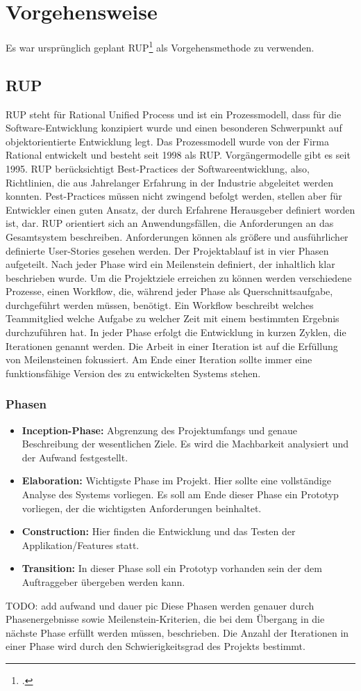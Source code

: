 \chapter{Vorgehensweise}
\reiter
Es war ursprünglich geplant RUP\footcite{Lehrunterlagen-RUP} als Vorgehensmethode zu verwenden. 
\section{RUP}
RUP steht für Rational Unified Process und ist ein Prozessmodell, dass für die Software-Entwicklung konzipiert wurde und einen besonderen Schwerpunkt auf objektorientierte Entwicklung legt. Das Prozessmodell wurde von der Firma Rational entwickelt und besteht seit 1998 als RUP. Vorgängermodelle gibt es seit 1995. 
RUP berücksichtigt Best-Practices der Softwareentwicklung, also, Richtlinien, die aus Jahrelanger Erfahrung in der Industrie abgeleitet werden konnten. Pest-Practices müssen nicht zwingend befolgt werden, stellen aber für Entwickler einen guten Ansatz, der durch Erfahrene Herausgeber definiert worden ist, dar. 
RUP orientiert sich an Anwendungsfällen, die Anforderungen an das Gesamtsystem beschreiben. Anforderungen können als größere und ausführlicher definierte User-Stories gesehen werden.  
Der Projektablauf ist in vier Phasen aufgeteilt. Nach jeder Phase wird ein Meilenstein definiert, der inhaltlich klar beschrieben wurde.
Um die Projektziele erreichen zu können werden verschiedene Prozesse, einen Workflow, die, während jeder Phase als Querschnittsaufgabe, durchgeführt werden müssen, benötigt. Ein Workflow beschreibt welches Teammitglied welche Aufgabe zu welcher Zeit mit einem bestimmten Ergebnis durchzuführen hat.
In jeder Phase erfolgt die Entwicklung in kurzen Zyklen, die Iterationen genannt werden. Die Arbeit in einer Iteration ist auf die Erfüllung von Meilensteinen fokussiert. Am Ende einer Iteration sollte immer eine funktionsfähige Version des zu entwickelten Systems stehen. 
\subsection{Phasen}
\begin{itemize}
	\item \textbf{Inception-Phase:} Abgrenzung des Projektumfangs und genaue Beschreibung der wesentlichen Ziele. Es wird die Machbarkeit analysiert und der Aufwand festgestellt.
	\item \textbf{Elaboration:} Wichtigste Phase im Projekt. Hier sollte eine vollständige Analyse des Systems vorliegen. Es soll am Ende dieser Phase ein Prototyp vorliegen, der die wichtigsten Anforderungen beinhaltet.
	\item \textbf{Construction:} Hier finden die Entwicklung und das Testen der Applikation/Features statt.
	\item \textbf{Transition:} In dieser Phase soll ein Prototyp vorhanden sein der dem Auftraggeber übergeben werden kann. 
\end{itemize}
TODO: add aufwand und dauer pic
Diese Phasen werden genauer durch Phasenergebnisse sowie Meilenstein-Kriterien, die bei dem Übergang in die nächste Phase erfüllt werden müssen, beschrieben.
Die Anzahl der Iterationen in einer Phase wird durch den Schwierigkeitsgrad des Projekts bestimmt. 
